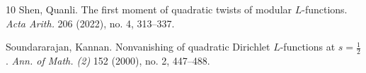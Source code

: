 \documentclass[12pt,reqno]{amsart}
\numberwithin{equation}{section}
\theoremstyle{plain}
\theoremstyle{definition}
\theoremstyle{remark}
\begin{document}
\begin{thebibliography}{10}
Shen, Quanli.
The first moment of quadratic twists of modular $L$-functions.
\emph{Acta Arith.} 206 (2022), no. 4, 313--337.




Soundararajan, Kannan.
Nonvanishing of quadratic Dirichlet $L$-functions at $s=\frac{1}{2}$.
\emph{Ann. of Math. (2)} 152 (2000), no. 2, 447--488.



\end{thebibliography}
\end{document}

